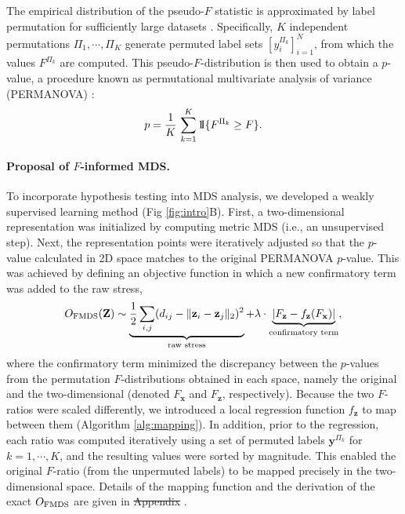 \documentclass[10pt,letterpaper]{article}
\newcommand{\1}{{\rm 1}\kern-0.24em{\rm I}}
\providecommand{\DIFaddtex}[1]{{\protect\color{blue}\uwave{#1}}} %
\providecommand{\DIFdeltex}[1]{{\protect\color{red}\sout{#1}}}                      %
\providecommand{\DIFaddbegin}{} %
\providecommand{\DIFaddend}{} %
\providecommand{\DIFdelbegin}{} %
\providecommand{\DIFdelend}{} %
\providecommand{\DIFadd}[1]{\texorpdfstring{\DIFaddtex{#1}}{#1}} %
\providecommand{\DIFdel}[1]{\texorpdfstring{\DIFdeltex{#1}}{}} %
\newcommand{\DIFscaledelfig}{0.5}
\newlength{\DIFdelgraphicswidth} %
\newlength{\DIFdelgraphicsheight} %
\newcommand{\DIFaddincludegraphics}[2][]{{\color{blue}\fbox{\DIFOincludegraphics[#1]{#2}}}} %
\newcommand{\DIFdelincludegraphics}[2][]{%
\sbox{\DIFdelgraphicsbox}{\DIFOincludegraphics[#1]{#2}}%
\settoboxwidth{\DIFdelgraphicswidth}{\DIFdelgraphicsbox} %
\settoboxtotalheight{\DIFdelgraphicsheight}{\DIFdelgraphicsbox} %
\scalebox{\DIFscaledelfig}{%
\parbox[b]{\DIFdelgraphicswidth}{\usebox{\DIFdelgraphicsbox}\\[-\baselineskip] \rule{\DIFdelgraphicswidth}{0em}}\llap{\resizebox{\DIFdelgraphicswidth}{\DIFdelgraphicsheight}{%
\setlength{\unitlength}{\DIFdelgraphicswidth}%
\begin{picture}(1,1)%
\thicklines\linethickness{2pt} %
{\color[rgb]{1,0,0}\put(0,0){\framebox(1,1){}}}%
{\color[rgb]{1,0,0}\put(0,0){\line( 1,1){1}}}%
{\color[rgb]{1,0,0}\put(0,1){\line(1,-1){1}}}%
\end{picture}%
}\hspace*{3pt}}} %
} %
\DeclareRobustCommand{\DIFaddbegin}{\DIFOaddbegin \let\includegraphics\DIFaddincludegraphics} %
\DeclareRobustCommand{\DIFaddend}{\DIFOaddend \let\includegraphics\DIFOincludegraphics} %
\DeclareRobustCommand{\DIFdelbegin}{\DIFOdelbegin \let\includegraphics\DIFdelincludegraphics} %
\DeclareRobustCommand{\DIFdelend}{\DIFOaddend \let\includegraphics\DIFOincludegraphics} %
\begin{document}
The empirical distribution of the pseudo-$F$ statistic is approximated by label permutation for sufficiently large datasets \cite{holmes96, gijbels13}.
Specifically, $K$ independent permutations $\Pi_1 , \cdots ,\Pi_K$ generate permuted label sets $[y_i^{\Pi_k}]_{i=1}^{N}$, from which the values $F^{\Pi_k}$ are computed. This pseudo-$F$-distribution is then used to obtain a $p$-value, a procedure known as permutational multivariate analysis of variance (PERMANOVA) \cite{anderson01}:
\begin{equation}
p = \frac{1}{K}\,\sum_{k=1}^{K}\1\{F^{\Pi_k}\geq F\}.
\end{equation}

\paragraph*{Proposal of $F$-informed MDS.}
To incorporate hypothesis testing into MDS analysis, we developed a weakly supervised learning method (Fig \ref{fig:intro}B).
First, a two-dimensional representation was initialized by computing metric MDS (i.e., an unsupervised step).
Next, the representation points were iteratively adjusted so that the $p$-value calculated in 2D space matches to the original PERMANOVA $p$-value.
This was achieved by defining an objective function in which a new confirmatory term was added to the raw stress,
\begin{equation} \label{eq:fmds}
    O_{\rm FMDS}(\mathbf{Z}) \sim
    \underbrace{\frac{1}{2}\sum_{i,j} (d_{ij} - \| \mathbf{z}_i - \mathbf{z}_j \|_2 )^2}_\text{raw stress} +
    \lambda\cdot \underbrace{\left|F_\mathbf{z} - f_\mathbf{z}(F_\mathbf{x})\right|}_\text{confirmatory term},
\end{equation}
where the confirmatory term minimized the discrepancy between the $p$-values from the permutation $F$-distributions obtained in each space, namely the original and the two-dimensional (denoted $F_\mathbf{x}$ and $F_\mathbf{z}$, respectively).
Because the two $F$-ratios were scaled differently, we introduced a local regression function $f_\mathbf{z}$ to map between them (Algorithm \ref{alg:mapping}). In addition, prior to the regression, each ratio was computed iteratively using a set of permuted labels $\mathbf{y}^{\Pi_k}$ for $k=1, \cdots, K$, and the resulting values were sorted by magnitude. This enabled the original $F$-ratio (from the unpermuted labels) to be mapped precisely in the two-dimensional space.
Details of the mapping function and the derivation of the exact $O_{\rm FMDS}$ are given in \DIFdelbegin %
\DIFdel{Appendix }\DIFdelend \DIFaddbegin \DIFadd{Appendix A, } \DIFadd{File}\DIFaddend .
\end{document}
